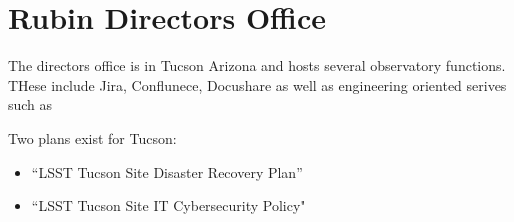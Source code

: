 \section{Rubin Directors Office} \label{sec:rdo}

The directors office is in Tucson Arizona and hosts several observatory functions.
THese include Jira, Conflunece, Docushare  as well as  engineering oriented serives such as


Two plans exist for Tucson:

\begin{itemize}
\item “LSST Tucson Site Disaster Recovery Plan” 
\item “LSST Tucson Site IT Cybersecurity Policy" 
\end{itemize}
